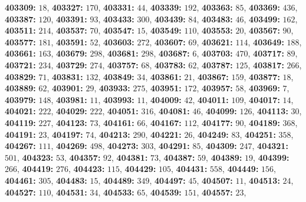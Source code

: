 \textsf{\bfseries 403309:} $18$, \textsf{\bfseries 403327:} $170$, \textsf{\bfseries 403331:} $44$, \textsf{\bfseries 403339:} $192$, \textsf{\bfseries 403363:} $85$, \textsf{\bfseries 403369:} $436$, \textsf{\bfseries 403387:} $120$, \textsf{\bfseries 403391:} $93$, \textsf{\bfseries 403433:} $300$, \textsf{\bfseries 403439:} $84$, \textsf{\bfseries 403483:} $46$, \textsf{\bfseries 403499:} $162$, \textsf{\bfseries 403511:} $214$, \textsf{\bfseries 403537:} $70$, \textsf{\bfseries 403547:} $15$, \textsf{\bfseries 403549:} $110$, \textsf{\bfseries 403553:} $20$, \textsf{\bfseries 403567:} $90$, \textsf{\bfseries 403577:} $181$, \textsf{\bfseries 403591:} $52$, \textsf{\bfseries 403603:} $272$, \textsf{\bfseries 403607:} $69$, \textsf{\bfseries 403621:} $114$, \textsf{\bfseries 403649:} $188$, \textsf{\bfseries 403661:} $163$, \textsf{\bfseries 403679:} $298$, \textsf{\bfseries 403681:} $298$, \textsf{\bfseries 403687:} $6$, \textsf{\bfseries 403703:} $470$, \textsf{\bfseries 403717:} $89$, \textsf{\bfseries 403721:} $234$, \textsf{\bfseries 403729:} $274$, \textsf{\bfseries 403757:} $68$, \textsf{\bfseries 403783:} $62$, \textsf{\bfseries 403787:} $125$, \textsf{\bfseries 403817:} $266$, \textsf{\bfseries 403829:} $71$, \textsf{\bfseries 403831:} $132$, \textsf{\bfseries 403849:} $34$, \textsf{\bfseries 403861:} $21$, \textsf{\bfseries 403867:} $159$, \textsf{\bfseries 403877:} $18$, \textsf{\bfseries 403889:} $62$, \textsf{\bfseries 403901:} $29$, \textsf{\bfseries 403933:} $275$, \textsf{\bfseries 403951:} $172$, \textsf{\bfseries 403957:} $58$, \textsf{\bfseries 403969:} $7$, \textsf{\bfseries 403979:} $148$, \textsf{\bfseries 403981:} $11$, \textsf{\bfseries 403993:} $11$, \textsf{\bfseries 404009:} $42$, \textsf{\bfseries 404011:} $109$, \textsf{\bfseries 404017:} $14$, \textsf{\bfseries 404021:} $222$, \textsf{\bfseries 404029:} $222$, \textsf{\bfseries 404051:} $316$, \textsf{\bfseries 404081:} $46$, \textsf{\bfseries 404099:} $126$, \textsf{\bfseries 404113:} $30$, \textsf{\bfseries 404119:} $227$, \textsf{\bfseries 404123:} $73$, \textsf{\bfseries 404161:} $66$, \textsf{\bfseries 404167:} $112$, \textsf{\bfseries 404177:} $90$, \textsf{\bfseries 404189:} $368$, \textsf{\bfseries 404191:} $23$, \textsf{\bfseries 404197:} $74$, \textsf{\bfseries 404213:} $290$, \textsf{\bfseries 404221:} $26$, \textsf{\bfseries 404249:} $83$, \textsf{\bfseries 404251:} $358$, \textsf{\bfseries 404267:} $111$, \textsf{\bfseries 404269:} $498$, \textsf{\bfseries 404273:} $303$, \textsf{\bfseries 404291:} $85$, \textsf{\bfseries 404309:} $247$, \textsf{\bfseries 404321:} $501$, \textsf{\bfseries 404323:} $53$, \textsf{\bfseries 404357:} $92$, \textsf{\bfseries 404381:} $73$, \textsf{\bfseries 404387:} $59$, \textsf{\bfseries 404389:} $19$, \textsf{\bfseries 404399:} $266$, \textsf{\bfseries 404419:} $276$, \textsf{\bfseries 404423:} $115$, \textsf{\bfseries 404429:} $105$, \textsf{\bfseries 404431:} $558$, \textsf{\bfseries 404449:} $156$, \textsf{\bfseries 404461:} $305$, \textsf{\bfseries 404483:} $15$, \textsf{\bfseries 404489:} $349$, \textsf{\bfseries 404497:} $45$, \textsf{\bfseries 404507:} $11$, \textsf{\bfseries 404513:} $24$, \textsf{\bfseries 404527:} $110$, \textsf{\bfseries 404531:} $34$, \textsf{\bfseries 404533:} $65$, \textsf{\bfseries 404539:} $151$, \textsf{\bfseries 404557:} $23$, 
